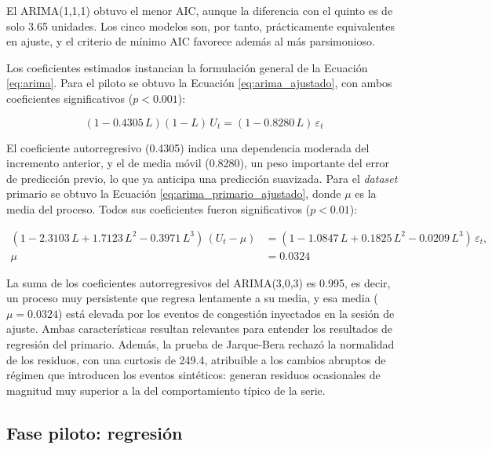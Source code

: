 \documentclass[12pt]{report}
\begin{document}
El ARIMA(1,1,1) obtuvo el menor AIC, aunque la diferencia con el quinto es de solo 3.65 unidades. Los cinco modelos son, por tanto, prácticamente equivalentes en ajuste, y el criterio de mínimo AIC favorece además al más parsimonioso.

Los coeficientes estimados instancian la formulación general de la Ecuación \ref{eq:arima}. Para el piloto se obtuvo la Ecuación \ref{eq:arima_ajustado}, con ambos coeficientes significativos ($p<0.001$):

\begin{equation}
    (1 - 0.4305\,L)(1-L)\,U_t = (1 - 0.8280\,L)\,\varepsilon_t
    \label{eq:arima_ajustado}
\end{equation}

El coeficiente autorregresivo (0.4305) indica una dependencia moderada del incremento anterior, y el de media móvil (0.8280), un peso importante del error de predicción previo, lo que ya anticipa una predicción suavizada. Para el \textit{dataset} primario se obtuvo la Ecuación \ref{eq:arima_primario_ajustado}, donde $\mu$ es la media del proceso. Todos sus coeficientes fueron significativos ($p<0.01$):

\begin{equation}
\begin{aligned}
    (1 - 2.3103\,L + 1.7123\,L^2 - 0.3971\,L^3)\,(U_t - \mu) &= (1 - 1.0847\,L + 0.1825\,L^2 - 0.0209\,L^3)\,\varepsilon_t, \\
    \mu &= 0.0324
\end{aligned}
\label{eq:arima_primario_ajustado}
\end{equation}

La suma de los coeficientes autorregresivos del ARIMA(3,0,3) es 0.995, es decir, un proceso muy persistente que regresa lentamente a su media, y esa media ($\mu=0.0324$) está elevada por los eventos de congestión inyectados en la sesión de ajuste. Ambas características resultan relevantes para entender los resultados de regresión del primario. Además, la prueba de Jarque-Bera rechazó la normalidad de los residuos, con una curtosis de 249.4, atribuible a los cambios abruptos de régimen que introducen los eventos sintéticos: generan residuos ocasionales de magnitud muy superior a la del comportamiento típico de la serie.

\subsection*{Fase piloto: regresión}
\end{document}
